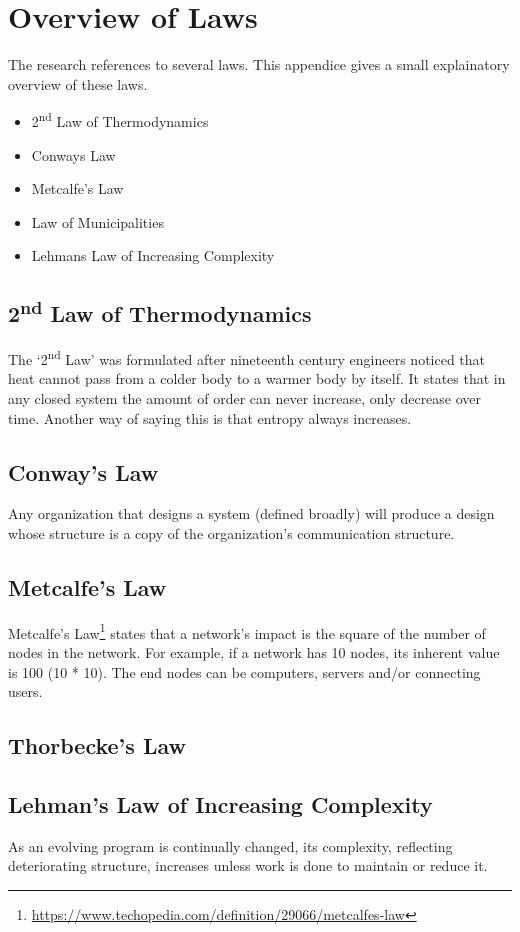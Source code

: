 \chapter{Overview of Laws}
\setcounter{footnote}{0}
The research references to several laws. This appendice gives a small explainatory overview of these laws.

\begin{itemize}
	\item{2\textsuperscript{nd} Law of Thermodynamics}
	\item{Conways Law}
	\item{Metcalfe's Law}
	\item{Law of Municipalities}
	\item{Lehmans Law of Increasing Complexity}
\end{itemize}

\section{2\textsuperscript{nd} Law of Thermodynamics}
\label{sec:appendix2ndlawthermodynamics}
The ‘2\textsuperscript{nd} Law’ was formulated after nineteenth century engineers noticed that heat cannot pass from a colder body to a warmer body by itself. It states that in any closed system the amount of order can never increase, only decrease over time. Another way of saying this is that entropy always increases.

\section{Conway's Law}
Any organization that designs a system (defined broadly) will produce a design whose structure is a copy of the organization's communication structure.

\section{Metcalfe's Law}
Metcalfe's Law\footnote{\url{https://www.techopedia.com/definition/29066/metcalfes-law}} states that a network's impact is the square of the number of nodes in the network. For example, if a network has 10 nodes, its inherent value is 100 (10 * 10). The end nodes can be computers, servers and/or connecting users.

\section{Thorbecke's Law}

\section{Lehman's Law of Increasing Complexity}
As an evolving program is continually changed, its complexity, reflecting deteriorating structure, increases unless work is done to maintain or reduce it.

